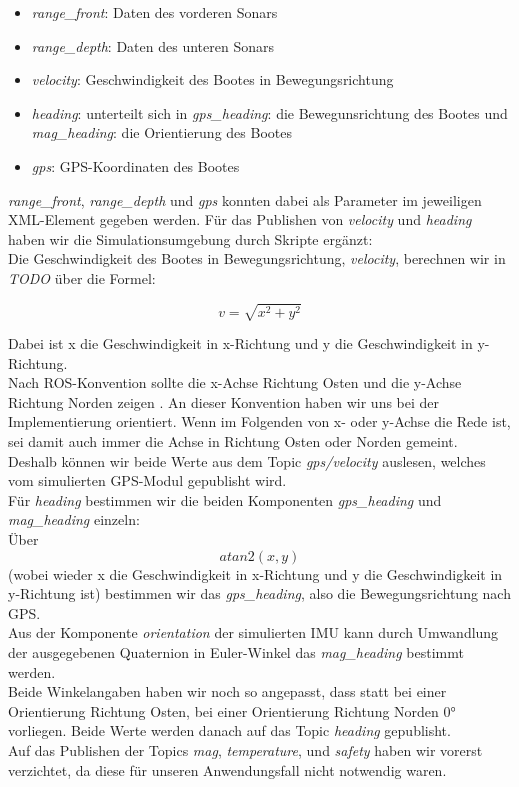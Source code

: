 \documentclass[conference]{IEEEtran}
\begin{document}
\begin{itemize}
	\item \textit{range\_front}: Daten des vorderen Sonars
	\item \textit{range\_depth}: Daten des unteren Sonars
	\item \textit{velocity}: Geschwindigkeit des Bootes in Bewegungsrichtung
	\item \textit{heading}: unterteilt sich in \textit{gps\_heading}: die Bewegunsrichtung des Bootes und \textit{mag\_heading}: die Orientierung des Bootes
	\item \textit{gps}: GPS-Koordinaten des Bootes
\end{itemize}
\textit{range\_front}, \textit{range\_depth} und \textit{gps} konnten dabei als Parameter im jeweiligen XML-Element gegeben werden. Für das Publishen von \textit{velocity} und \textit{heading} haben wir die Simulationsumgebung durch Skripte ergänzt:\\
Die Geschwindigkeit des Bootes in Bewegungsrichtung, \textit{velocity}, berechnen wir in \textit{TODO} über die Formel:

\begin{equation}
v = \sqrt{x^2+y^2}
\end{equation}

Dabei ist x die Geschwindigkeit in x-Richtung und y die Geschwindigkeit in y-Richtung.\\
Nach ROS-Konvention sollte die x-Achse Richtung Osten und die y-Achse Richtung Norden zeigen \cite{REP105}. An dieser Konvention haben wir uns bei der Implementierung orientiert. Wenn im Folgenden von x- oder y-Achse die Rede ist, sei damit auch immer die Achse in Richtung Osten oder Norden gemeint.\\
Deshalb können wir beide Werte aus dem Topic \textit{gps/velocity} auslesen, welches vom simulierten GPS-Modul gepublisht wird.\\
Für \textit{heading} bestimmen wir die beiden Komponenten \textit{gps\_heading} und \textit{mag\_heading} einzeln:\\
Über 
\begin{equation}
	atan2(x,y) 	
\end{equation}
(wobei wieder x die Geschwindigkeit in x-Richtung und y die Geschwindigkeit in y-Richtung ist) bestimmen wir das \textit{gps\_heading}, also die Bewegungsrichtung nach GPS. \\
Aus der Komponente \textit{orientation} der simulierten IMU kann durch Umwandlung der ausgegebenen Quaternion in Euler-Winkel das \textit{mag\_heading} bestimmt werden.\\
Beide Winkelangaben haben wir noch so angepasst, dass statt bei einer Orientierung Richtung Osten, bei einer Orientierung Richtung Norden 0° vorliegen. Beide Werte werden danach auf das Topic \textit{heading} gepublisht.\\
Auf das Publishen der Topics \textit{mag}, \textit{temperature}, und \textit{safety} haben wir vorerst verzichtet, da diese für unseren Anwendungsfall nicht notwendig waren.
\end{document}
